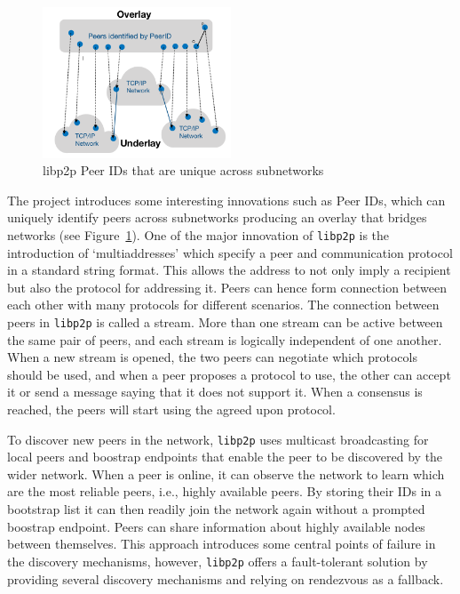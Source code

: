 \begin{figure}[ht]
    \centering
    \includegraphics[width=0.5\textwidth]{imgs/0oGSfw7.png}
    \caption{libp2p Peer IDs that are unique across subnetworks}
    \label{fig:libp2pPeerIds}
\end{figure}

The project introduces some interesting innovations such as Peer IDs, which can uniquely identify peers across subnetworks producing an overlay that bridges networks (see Figure~\ref{fig:libp2pPeerIds}). One of the major innovation of \verb+libp2p+ is the introduction of `multiaddresses' which specify a peer and communication protocol in a standard string format. This allows the address to not only imply a recipient but also the protocol for addressing it. Peers can hence form connection between each other with many protocols for different scenarios. The connection between peers in \verb+libp2p+ is called a stream. More than one stream can be active between the same pair of peers, and each stream is logically independent of one another. When a new stream is opened, the two peers can negotiate which protocols should be used, and when a peer proposes a protocol to use, the other can accept it or send a message saying that it does not support it. When a consensus is reached, the peers will start using the agreed upon protocol.\cite{guidi2021libp2p}

To discover new peers in the network, \verb+libp2p+ uses multicast broadcasting for local peers and boostrap endpoints that enable the peer to be discovered by the wider network. When a peer is online, it can observe the network to learn which are the most reliable peers, i.e., highly available peers. By storing their IDs in a bootstrap list it can then readily join the network again without a prompted boostrap endpoint. Peers can share information about highly available nodes between themselves. This approach introduces some central points of failure in the discovery mechanisms, however, \verb+libp2p+ offers a fault-tolerant solution by providing several discovery mechanisms and relying on rendezvous as a fallback.

